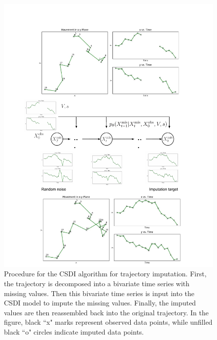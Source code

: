 \documentclass[11pt]{article}
\begin{document}
 
\begin{figure}[h]
  \centering
  \includegraphics[width=\textwidth]{../figure/algorithm} %
  \caption{Procedure for the CSDI algorithm for trajectory imputation. First, the trajectory is decomposed into a bivariate time series with missing values. Then this bivariate time series is input into the CSDI model to impute the missing values. Finally, the imputed values are then reassembled back into the original trajectory. In the figure, black ``x" marks represent observed data points, while unfilled black ``o" circles indicate imputed data points.}
  \label{fig: visualization of the CSDI for trajectory imputation} %
\end{figure}





\end{document}
